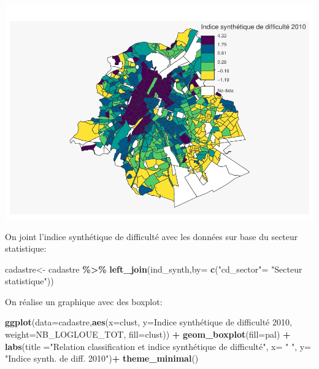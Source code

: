 \documentclass[
]{book}
\newenvironment{Shaded}{\begin{snugshade}}{\end{snugshade}}
\newcommand{\AttributeTok}[1]{\textcolor[rgb]{0.13,0.29,0.53}{#1}}
\newcommand{\FunctionTok}[1]{\textcolor[rgb]{0.13,0.29,0.53}{\textbf{#1}}}
\newcommand{\NormalTok}[1]{#1}
\newcommand{\OtherTok}[1]{\textcolor[rgb]{0.56,0.35,0.01}{#1}}
\newcommand{\SpecialCharTok}[1]{\textcolor[rgb]{0.81,0.36,0.00}{\textbf{#1}}}
\newcommand{\StringTok}[1]{\textcolor[rgb]{0.31,0.60,0.02}{#1}}
\begin{document}
\includegraphics{manuel_geo_quanti_files/figure-latex/unnamed-chunk-110-1.pdf}

On joint l'indice synthétique de difficulté avec les données sur base du secteur statistique:

\begin{Shaded}
\begin{Highlighting}[]
\NormalTok{cadastre}\OtherTok{\textless{}{-}}\NormalTok{ cadastre }\SpecialCharTok{\%\textgreater{}\%}
  \FunctionTok{left\_join}\NormalTok{(ind\_synth,}\AttributeTok{by=} \FunctionTok{c}\NormalTok{(}\StringTok{"cd\_sector"}\OtherTok{=} \StringTok{"Secteur statistique"}\NormalTok{))}
\end{Highlighting}
\end{Shaded}

On réalise un graphique avec des boxplot:

\begin{Shaded}
\begin{Highlighting}[]
\FunctionTok{ggplot}\NormalTok{(}\AttributeTok{data=}\NormalTok{cadastre,}\FunctionTok{aes}\NormalTok{(}\AttributeTok{x=}\NormalTok{clust,}
                           \AttributeTok{y=}\StringTok{\textasciigrave{}}\AttributeTok{Indice synthétique de difficulté 2010}\StringTok{\textasciigrave{}}\NormalTok{,}
                           \AttributeTok{weight=}\NormalTok{NB\_LOGLOUE\_TOT,}
                           \AttributeTok{fill=}\NormalTok{clust)) }\SpecialCharTok{+}
\FunctionTok{geom\_boxplot}\NormalTok{(}\AttributeTok{fill=}\NormalTok{pal) }\SpecialCharTok{+}
\FunctionTok{labs}\NormalTok{(}\AttributeTok{title =}\StringTok{"Relation classification et indice synthétique de difficulté"}\NormalTok{,}
       \AttributeTok{x=} \StringTok{" "}\NormalTok{,}
       \AttributeTok{y=} \StringTok{"Indice synth. de diff. 2010"}\NormalTok{)}\SpecialCharTok{+}
\FunctionTok{theme\_minimal}\NormalTok{()}
\end{Highlighting}
\end{Shaded}
\end{document}
